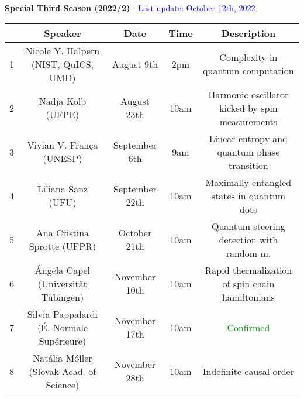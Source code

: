 \documentclass[a4paper,preprintnumbers,floatfix,superscriptaddress,pra,onecolumn,showpacs,notitlepage,longbibliography]{revtex4-1}
\begin{document}
\vspace{1cm}
\textbf{Special Third Season (2022/2)} - \textcolor{blue}{Last update: October 12th, 2022}
\begin{center}
\hspace{-1cm}
 \begin{tabular}{| c | c | c | c | c |} 
    \hline
 & Speaker & Date & Time & Description \\ [0.5ex] 
 \hline\hline
 
 1 & Nicole Y. Halpern (NIST, QuICS, UMD) & August 9th & 2pm & Complexity in quantum computation\\
 \hline
 2 & Nadja Kolb (UFPE) & August 23th & 10am & Harmonic oscillator kicked by spin measurements \\
 \hline
 3 & Vivian V. França (UNESP) & September 6th & 9am & Linear entropy and quantum phase transition\\
 \hline
 4 & Liliana Sanz (UFU) & September 22th & 10am & Maximally entangled states in quantum dots \\
 \hline
 5 & Ana Cristina Sprotte (UFPR) & October 21th & 10am & Quantum steering detection with random m.\\
 \hline
 6 & Ángela Capel (Universität Tübingen) & November 10th & 10am & Rapid thermalization of spin chain hamiltonians \\
 \hline
 7 & Silvia Pappalardi (É. Normale Supérieure) & November 17th & 10am & \textcolor{green}{Confirmed} \\
 \hline
 8 & Natália Móller (Slovak Acad. of Science) & November 28th & 10am & Indefinite causal order\\
 \hline
 
 \end{tabular}
\end{center}
 
\end{document}
